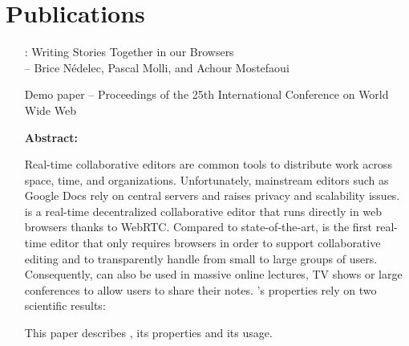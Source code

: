 
\section{Publications}

\begin{itemize}
\item [\CRATE: Writing Stories Together in our Browsers]\ \\
  -- Brice Nédelec, Pascal Molli, and Achour Mostefaoui
\item [Demo paper -- Proceedings of the 25th International Conference on World Wide
  Web]
\item [\textbf{Abstract:}] {\small Real-time collaborative editors are common
    tools to distribute work across space, time, and
    organizations. Unfortunately, mainstream editors such as Google Docs rely on
    central servers and raises privacy and scalability issues.  \CRATE is a
    real-time decentralized collaborative editor that runs directly in web
    browsers thanks to WebRTC. Compared to state-of-the-art, \CRATE is the first
    real-time editor that only requires browsers in order to support
    collaborative editing and to transparently handle from small to large groups
    of users. Consequently, \CRATE can also be used in massive online lectures,
    TV shows or large conferences to allow users to share their notes. \CRATE's
    properties rely on two scientific results:
  This paper describes \CRATE, its properties and its usage.}
\end{itemize}

